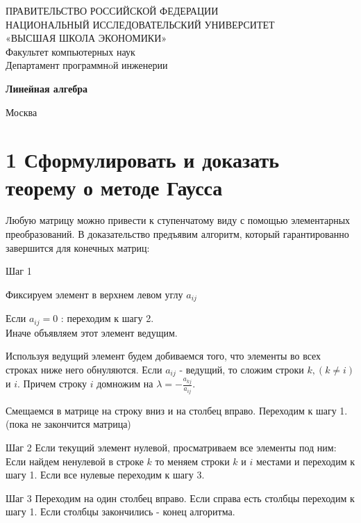 \documentclass[a4paper,12pt,twoside]{article}
\newenvironment{my_enumerate}{
\begin{enumerate}
  \setlength{\itemsep}{1pt}
  \setlength{\parskip}{0pt}
  \setlength{\parsep}{0pt}}{\end{enumerate}
}
\begin{document}

\begin{titlepage}
\begin{center}
\vspace*{0.7cm}
{\large ПРАВИТЕЛЬСТВО РОССИЙСКОЙ ФЕДЕРАЦИИ \\
НАЦИОНАЛЬНЫЙ ИССЛЕДОВАТЕЛЬСКИЙ УНИВЕРСИТЕТ \\
«ВЫСШАЯ ШКОЛА ЭКОНОМИКИ» }\\
\vspace*{0.2cm}
Факультет компьютерных наук \\
\smallskip
{\small Департамент программнoй инженерии \\
}
\vspace{1cm}

{\textbf{Линейная алгебра}} \\
\medskip

Москва \number\year \\
\end{center}
\end{titlepage}

\newpage

\newpage
\tableofcontents
{}

\newpage

\section{1 Сформулировать и доказать теорему о методе Гаусса}
Любую матрицу можно привести к ступенчатому виду с помощью элементарных преобразований.
В доказательство предъявим алгоритм, который гарантированно завершится для конечных матриц:
\begin{my_enumerate}
\item[Шаг 1]
\begin{my_enumerate}
\item Фиксируем элемент в верхнем левом углу $ a_{ij} $
\item Если $a_{ij} = 0$ : переходим к шагу 2. \\
Иначе объявляем этот элемент ведущим.
\item Используя ведущий элемент будем добиваемся того, что элементы во всех строках ниже него обнуляются. Если $ a_{ij} $ - ведущий, то сложим строки $ k, ( k \neq i ) $ и $i$. Причем строку $i$ домножим на $ \lambda = - \frac{a_{kj}}{a_{ij}}$.
\item Смещаемся в матрице на строку вниз и на столбец вправо. Переходим к шагу 1. (пока не закончится матрица)
\end{my_enumerate}

\item[Шаг 2] Если текущий элемент нулевой, просматриваем все элементы под ним: Если найдем ненулевой в строке $k$ то меняем строки $k$ и $i$ местами и переходим к шагу 1. Если все нулевые переходим к шагу 3.

\item[Шаг 3] Переходим на один столбец вправо. Если справа есть столбцы переходим к шагу 1. Если столбцы закончились - конец алгоритма. 

\end{my_enumerate}
\end{document}
